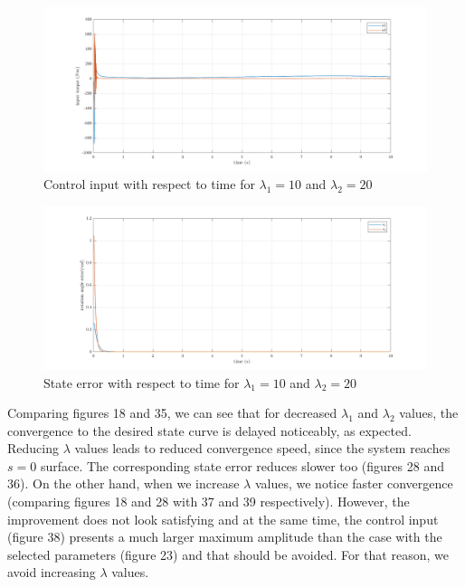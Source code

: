 \documentclass[a4paper]{article}
\begin{document}
\begin{figure}[H]
    \centering
    \includegraphics[width=15cm]{fig/sim2/lincrease/ulincrease.png}
    \caption{Control input with respect to time for $\lambda_1=10$ and $\lambda_2=20$}
\end{figure}
\begin{figure}[H]
    \centering
    \includegraphics[width=15cm]{fig/sim2/lincrease/elincrease.png}
    \caption{State error with respect to time for $\lambda_1=10$ and $\lambda_2=20$}
\end{figure}

\noindent\hspace{-2pt}
Comparing figures 18 and 35, we can see that for decreased $\lambda_1$ and $\lambda_2$ values, the convergence to the 
desired state curve is delayed noticeably, as expected. Reducing $\lambda$ values leads to reduced convergence speed, since 
the system reaches $s=0$ surface. The corresponding state error reduces slower too (figures 28 and 36). On the other hand, 
when we increase $\lambda$ values, we notice faster convergence (comparing figures 18 and 28 with 37 and 39 respectively). 
However, the improvement does not look satisfying and at the same time, the control input (figure 38) presents a much larger maximum 
amplitude than the case with the selected parameters (figure 23) and that should be avoided. For that reason, we avoid increasing 
$\lambda$ values.
\end{document}
